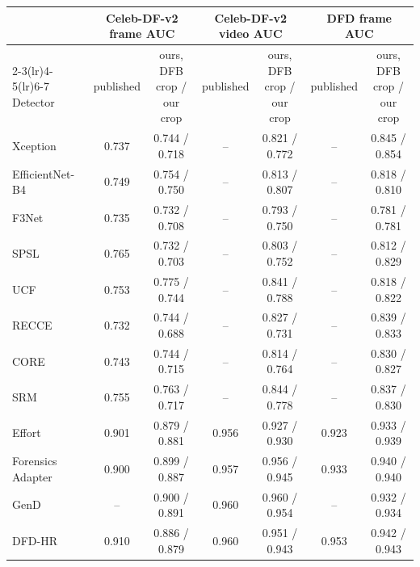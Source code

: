 \begin{tabular}{@{}l cc cc cc@{}}
\toprule
 & \multicolumn{2}{c}{Celeb-DF-v2 frame AUC} & \multicolumn{2}{c}{Celeb-DF-v2 video AUC} & \multicolumn{2}{c}{DFD frame AUC} \\
\cmidrule(lr){2-3}\cmidrule(lr){4-5}\cmidrule(lr){6-7}
Detector & published & ours, DFB crop / our crop & published & ours, DFB crop / our crop & published & ours, DFB crop / our crop \\
\midrule
Xception & 0.737 & 0.744 / 0.718 & -- & 0.821 / 0.772 & -- & 0.845 / 0.854 \\
EfficientNet-B4 & 0.749 & 0.754 / 0.750 & -- & 0.813 / 0.807 & -- & 0.818 / 0.810 \\
F3Net & 0.735 & 0.732 / 0.708 & -- & 0.793 / 0.750 & -- & 0.781 / 0.781 \\
SPSL & 0.765 & 0.732 / 0.703 & -- & 0.803 / 0.752 & -- & 0.812 / 0.829 \\
UCF & 0.753 & 0.775 / 0.744 & -- & 0.841 / 0.788 & -- & 0.818 / 0.822 \\
RECCE & 0.732 & 0.744 / 0.688 & -- & 0.827 / 0.731 & -- & 0.839 / 0.833 \\
CORE & 0.743 & 0.744 / 0.715 & -- & 0.814 / 0.764 & -- & 0.830 / 0.827 \\
SRM & 0.755 & 0.763 / 0.717 & -- & 0.844 / 0.778 & -- & 0.837 / 0.830 \\
Effort~\cite{effort} & 0.901 & 0.879 / 0.881 & 0.956 & 0.927 / 0.930 & 0.923 & 0.933 / 0.939 \\
Forensics Adapter~\cite{forensicsadapter} & 0.900 & 0.899 / 0.887 & 0.957 & 0.956 / 0.945 & 0.933 & 0.940 / 0.940 \\
GenD~\cite{gend2026} & -- & 0.900 / 0.891 & 0.960 & 0.960 / 0.954 & -- & 0.932 / 0.934 \\
DFD-HR~\cite{dfdhr2026} & 0.910 & 0.886 / 0.879 & 0.960 & 0.951 / 0.943 & 0.953 & 0.942 / 0.943 \\
\bottomrule
\end{tabular}
